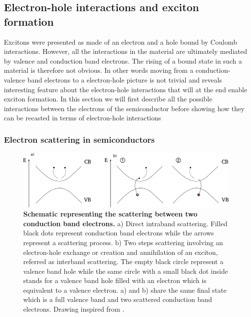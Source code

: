 \subsection{Electron-hole interactions and exciton formation}

Excitons were presented as made of an electron and a hole bound by Coulomb interactions. However, all the interactions in the material are ultimately mediated by valence and conduction band electrons. The rising
of a bound state in such a material is therefore not obvious. In other words moving from a conduction-valence band electrons to a electron-hole picture is not trivial and reveals interesting
feature about the electron-hole interactions that will at the end enable exciton formation. In this section we will first describe all the possible interactions between the electrons of the semiconductor before showing how they can be recasted in terms of electron-hole interactions \cite{Combescot_cooper_excitons_2015}

\bigskip
\subsubsection{Electron scattering in semiconductors}
\begin{figure}[h]
    \centering
    \includegraphics[width=1\linewidth]{chap_theory/fig/intra-inter-band-processes.pdf}
    \caption{\textbf{Schematic representing the scattering between two conduction band electrons.} a) Direct intraband scattering. Filled black dots represent conduction band electrons while the arrows represent a scattering process. b) Two steps scattering involving an electron-hole exchange or creation and annihilation of an exciton, referred as interband scattering.
    The empty black circle represent a valence band hole while the same circle with a small black dot inside stands for a valence band hole filled with an electron which is equivalent to a valence electron. a) and b) share the same
     final state which is a full valence band and two scattered conduction band electrons. Drawing inspired from \cite{Combescot_cooper_excitons_2015}.}
    \label{fig:inter-intra-scat}
\end{figure}


